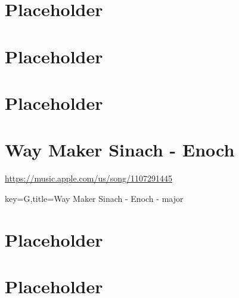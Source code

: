 \documentclass{article}
\begin{document}


\label{lbtoc}
\newcommand{\cursec}[0]{}
\tableofcontents
\pagebreak

\section{Placeholder}
\section{Placeholder}
\section{Placeholder}


\renewcommand{\cursec}[0]{Way Maker Sinach - Enoch}
\section{\cursec}
\backtotoc \quad \url{https://music.apple.com/us/song/1107291445}
\begin{song}[transpose=-5,enharmonic=sharp]{key=G,title={\cursec{} -  major}}
  
\end{song}
\medskip
\backtotoc
\pagebreak

\section{Placeholder} \pagebreak
\section{Placeholder} \pagebreak
\end{document}
